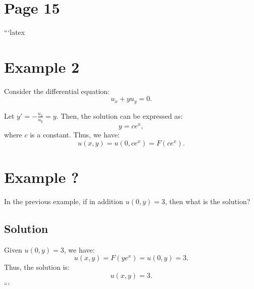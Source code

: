 \documentclass[11pt]{article}
\begin{document}
\section*{Page 15}

```latex
\section*{Example 2}

Consider the differential equation:
\begin{equation}
    u_x + y u_y = 0.
\end{equation}

Let \( y' = - \frac{u_x}{u_y} = y \). Then, the solution can be expressed as:
\begin{equation}
    y = ce^{x},
\end{equation}
where \( c \) is a constant. Thus, we have:
\begin{equation}
    u(x, y) = u(0, ce^{x}) = F(ce^{x}).
\end{equation}

\section*{Example ?}

In the previous example, if in addition \( u(0, y) = 3 \), then what is the solution?

\subsection*{Solution}

Given \( u(0, y) = 3 \), we have:
\begin{equation}
    u(x, y) = F(ye^{x}) = u(0, y) = 3.
\end{equation}
Thus, the solution is:
\begin{equation}
    u(x, y) = 3.
\end{equation}
```
\end{document}
